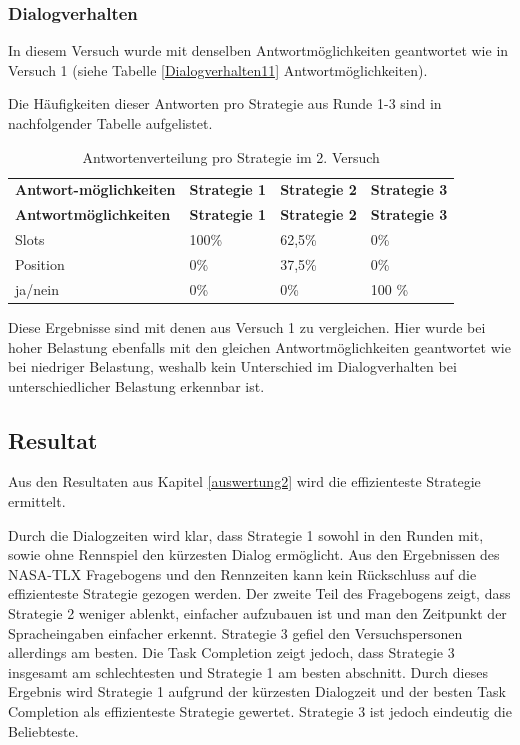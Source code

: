 \documentclass[12pt,a4paper]{scrartcl}
\begin{document}
\subsubsection{Dialogverhalten}
\label{DV2}
In diesem Versuch wurde mit denselben Antwortmöglichkeiten geantwortet wie in Versuch 1 (siehe Tabelle \ref{Dialogverhalten11} Antwortmöglichkeiten).

Die Häufigkeiten dieser Antworten pro Strategie aus Runde 1-3 sind in nachfolgender Tabelle aufgelistet.

\begin{longtable}{p{3cm}p{3cm}p{3cm}p{3cm} }
	\label{Dialogverhalten12}\\
		\caption[Antwortenverteilung pro Strategie im 2. Versuch]{Antwortenverteilung pro Strategie im 2. Versuch}\\
	\hline
\textbf{Antwort-möglichkeiten}&\textbf{Strategie 1}&\textbf{Strategie 2} &\textbf{Strategie 3}\\
	\hline
	\endfirsthead
	\hline
	\textbf{Antwortmöglichkeiten}&\textbf{Strategie 1}&\textbf{Strategie 2} &\textbf{Strategie 3}\\
	\hline
	\endhead
Slots & 100\% & 62,5\%\ & 0\%  \\
Position & 0\% & 37,5\% & 0\%  \\
ja/nein & 0\% & 0\%  & 100 \%  \\
\hline
\end{longtable}
Diese Ergebnisse sind mit denen aus Versuch 1 zu vergleichen. 
Hier wurde bei hoher Belastung ebenfalls mit den gleichen Antwortmöglichkeiten geantwortet wie bei niedriger Belastung, weshalb kein Unterschied im Dialogverhalten bei unterschiedlicher Belastung erkennbar ist. 




\subsection{Resultat}
Aus den Resultaten aus Kapitel \ref{auswertung2} wird die effizienteste Strategie ermittelt. \newline

Durch die Dialogzeiten wird klar, dass Strategie 1 sowohl in den Runden mit, sowie ohne Rennspiel den kürzesten Dialog ermöglicht. Aus den Ergebnissen des NASA-TLX Fragebogens und den Rennzeiten kann kein Rückschluss auf die effizienteste Strategie gezogen werden. Der zweite Teil des Fragebogens zeigt, dass Strategie 2 weniger ablenkt, einfacher aufzubauen ist und man den Zeitpunkt der Spracheingaben einfacher erkennt. Strategie 3 gefiel den Versuchspersonen allerdings am besten. Die Task Completion zeigt jedoch, dass Strategie 3 insgesamt am schlechtesten und Strategie 1 am besten abschnitt. \newline
Durch dieses Ergebnis wird Strategie 1 aufgrund der kürzesten Dialogzeit und der besten Task Completion als effizienteste Strategie gewertet. Strategie 3 ist jedoch eindeutig die Beliebteste. 
\end{document}
